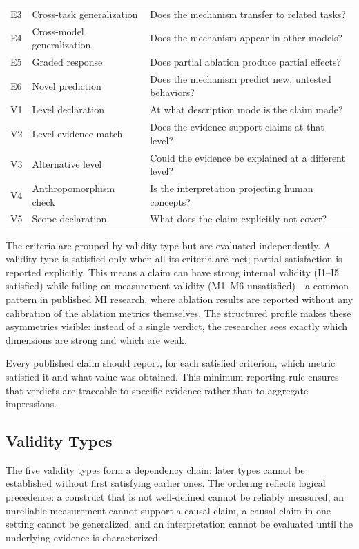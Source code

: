 \documentclass[10pt]{article}
\begin{document}
\begin{table}[H]
\begin{tabular}{@{}llp{8.5cm}@{}}
E3 & Cross-task generalization & Does the mechanism transfer to related tasks? \\
E4 & Cross-model generalization & Does the mechanism appear in other models? \\
E5 & Graded response & Does partial ablation produce partial effects? \\
E6 & Novel prediction & Does the mechanism predict new, untested behaviors? \\
\midrule
V1 & Level declaration & At what description mode is the claim made? \\
V2 & Level-evidence match & Does the evidence support claims at that level? \\
V3 & Alternative level & Could the evidence be explained at a different level? \\
V4 & Anthropomorphism check & Is the interpretation projecting human concepts? \\
V5 & Scope declaration & What does the claim explicitly not cover? \\
\bottomrule
\end{tabular}
\end{table}
\endgroup

The criteria are grouped by validity type but are evaluated independently. A validity type is satisfied only when all its criteria are met; partial satisfaction is reported explicitly. This means a claim can have strong internal validity (I1--I5 satisfied) while failing on measurement validity (M1--M6 unsatisfied)---a common pattern in published MI research, where ablation results are reported without any calibration of the ablation metrics themselves. The structured profile makes these asymmetries visible: instead of a single verdict, the researcher sees exactly which dimensions are strong and which are weak.

Every published claim should report, for each satisfied criterion, which metric satisfied it and what value was obtained. This minimum-reporting rule ensures that verdicts are traceable to specific evidence rather than to aggregate impressions.

\subsection{Validity Types}
\label{sec:validity-types}

The five validity types form a dependency chain: later types cannot be established without first satisfying earlier ones. The ordering reflects logical precedence: a construct that is not well-defined cannot be reliably measured, an unreliable measurement cannot support a causal claim, a causal claim in one setting cannot be generalized, and an interpretation cannot be evaluated until the underlying evidence is characterized.
\end{document}
